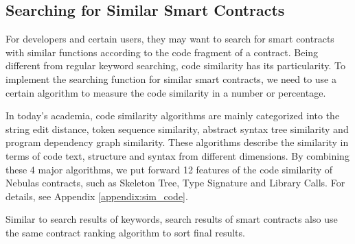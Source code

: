 

\subsection{Searching for Similar Smart Contracts}

For developers and certain users, they may want to search for smart contracts with similar functions according to the code fragment of a contract. Being different from regular keyword searching, code similarity has its particularity. To implement the searching function for similar smart contracts, we need to use a certain algorithm to measure the code similarity in a number or percentage.


In today's academia, code similarity algorithms are mainly categorized into the string edit distance, token sequence similarity, abstract syntax tree similarity and program dependency graph similarity. These algorithms describe the similarity in terms of code text, structure and syntax from different dimensions. By combining these 4 major algorithms, we put forward 12 features of the code similarity of Nebulas contracts, such as Skeleton Tree, Type Signature and Library Calls. For details, see Appendix \ref{appendix:sim_code}.


Similar to search results of keywords, search results of smart contracts also use the same contract ranking algorithm to sort final results.

